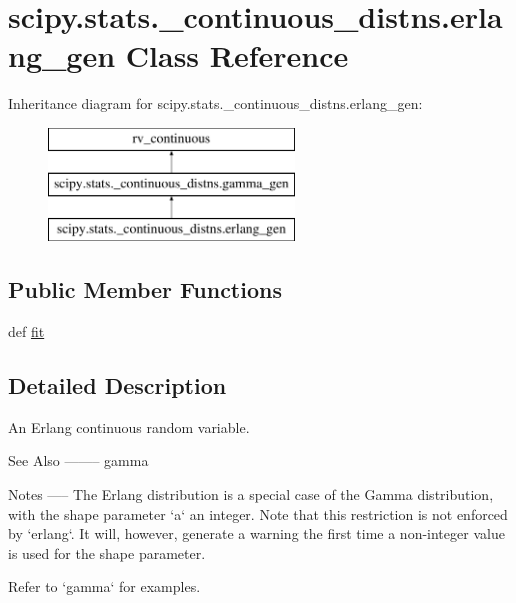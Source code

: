 \hypertarget{classscipy_1_1stats_1_1__continuous__distns_1_1erlang__gen}{}\section{scipy.\+stats.\+\_\+continuous\+\_\+distns.\+erlang\+\_\+gen Class Reference}
\label{classscipy_1_1stats_1_1__continuous__distns_1_1erlang__gen}
Inheritance diagram for scipy.\+stats.\+\_\+continuous\+\_\+distns.\+erlang\+\_\+gen\+:\begin{figure}[H]
\begin{center}
\leavevmode
\includegraphics[height=3.000000cm]{classscipy_1_1stats_1_1__continuous__distns_1_1erlang__gen}
\end{center}
\end{figure}
\subsection*{Public Member Functions}
\begin{DoxyCompactItemize}
\item 
def \hyperlink{classscipy_1_1stats_1_1__continuous__distns_1_1erlang__gen_ab04957934abc26cee1b439ff8b5f2f38}{fit}
\end{DoxyCompactItemize}


\subsection{Detailed Description}
\begin{DoxyVerb}An Erlang continuous random variable.


See Also
--------
gamma

Notes
-----
The Erlang distribution is a special case of the Gamma distribution, with
the shape parameter `a` an integer.  Note that this restriction is not
enforced by `erlang`. It will, however, generate a warning the first time
a non-integer value is used for the shape parameter.

Refer to `gamma` for examples.\end{DoxyVerb}
 

